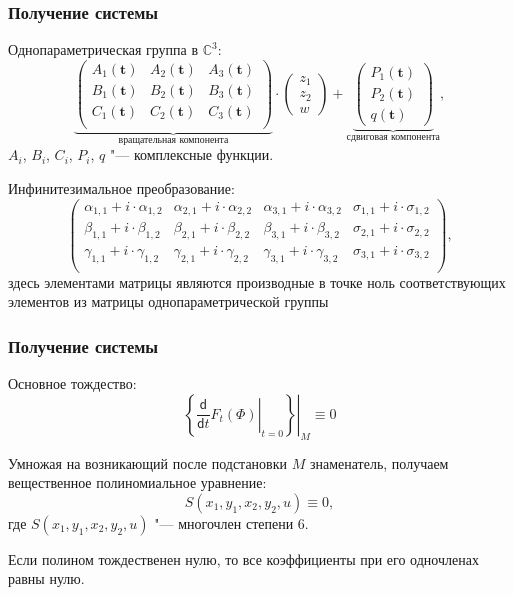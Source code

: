 \documentclass[russian,hyperref={unicode}]{beamer}
\begin{document}
{
	\frametitle{Получение системы}
	Однопараметрическая группа  в $\mathbb{C}^3$:
	\begin{equation*}
	\underbrace{
	\begin{pmatrix}
		A_1(\mathbf t) & A_2(\mathbf t) & A_3(\mathbf t) \\
		B_1(\mathbf t) & B_2(\mathbf t) & B_3(\mathbf t) \\
		C_1(\mathbf t) & C_2(\mathbf t) & C_3(\mathbf t) \\
	\end{pmatrix}}_\text{вращательная компонента}
	\cdot
	\begin{pmatrix}
		z_1 \\
		z_2 \\
		w
	\end{pmatrix}
	+
	\underbrace{
	\begin{pmatrix}
		P_1(\mathbf t) \\
		P_2(\mathbf t) \\
		q(\mathbf t)
	\end{pmatrix}}_\text{сдвиговая компонента},
	\end{equation*}
	$A_i$, $B_i$, $C_i$, $P_i$, $q$ "--- комплексные функции.

	Инфинитезимальное преобразование:
\begin{equation*}
\begin{pmatrix}
\alpha_{1,1} + i\cdot\alpha_{1,2} & \alpha_{2,1} + i\cdot\alpha_{2,2} & \alpha_{3,1} + i\cdot\alpha_{3,2} & \sigma_{1,1} + i\cdot\sigma_{1,2} \\
 \beta_{1,1} +  i\cdot\beta_{1,2} &  \beta_{2,1} +  i\cdot\beta_{2,2} &  \beta_{3,1} +  i\cdot\beta_{3,2} & \sigma_{2,1} + i\cdot\sigma_{2,2} \\
\gamma_{1,1} + i\cdot\gamma_{1,2} & \gamma_{2,1} + i\cdot\gamma_{2,2} & \gamma_{3,1} + i\cdot\gamma_{3,2} & \sigma_{3,1} + i\cdot\sigma_{3,2} \\
\end{pmatrix},
\end{equation*}
	здесь элементами матрицы являются производные в точке ноль соответствующих элементов из матрицы однопараметрической группы
}
\frame
{
	\frametitle{Получение системы}
	 Основное тождество:
 	$$
  	\left.\left\{ \left.\frac{\mathsf d}{\mathsf d t}F_t(\Phi) \right|_{t=0}\right\}\right|_{M} \equiv 0
	$$

  Умножая на возникающий после подстановки $M$ знаменатель, получаем вещественное полиномиальное уравнение:
  $$
  	S(x_1, y_1, x_2, y_2, u) \equiv 0,
  $$
  где $S(x_1, y_1, x_2, y_2, u)$ "--- многочлен степени 6.

  Если полином тождественен нулю, то все коэффициенты при его одночленах равны нулю.
}
\end{document}
